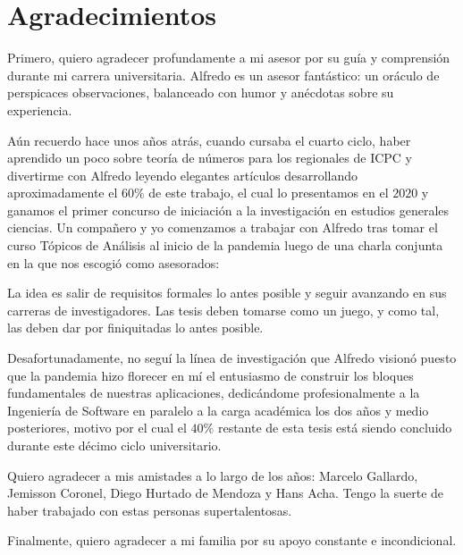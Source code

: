 \chapter*{Agradecimientos}
\thispagestyle{empty}

\vspace{-0.5cm}

Primero, quiero agradecer profundamente a mi asesor
por su guía y comprensión durante mi carrera universitaria.
Alfredo es un asesor fantástico:
un oráculo de perspicaces observaciones,
balanceado con humor
y anécdotas sobre su experiencia.

Aún recuerdo hace unos años atrás,
cuando cursaba el cuarto ciclo,
haber aprendido un poco sobre teoría de números
para los regionales de ICPC
y divertirme con Alfredo
leyendo elegantes artículos
desarrollando aproximadamente el \(60\%\) de este trabajo,
el cual lo presentamos en el \(2020\) y ganamos el
primer concurso de iniciación a la investigación en estudios generales ciencias.
Un compa\~nero y yo comenzamos a trabajar con Alfredo
tras tomar el curso Tópicos de Análisis al inicio de la pandemia
luego de una charla conjunta en la que nos escogió como asesorados:

\begin{displayquote}
La idea es salir de requisitos formales lo antes posible
y seguir avanzando en sus carreras de investigadores.
Las tesis deben tomarse como un juego,
y como tal,
las deben dar por finiquitadas lo antes posible.
\end{displayquote}

Desafortunadamente,
no seguí la línea de investigación
que Alfredo visionó
puesto que la pandemia
hizo florecer en mí
el entusiasmo de construir
los bloques fundamentales de nuestras aplicaciones,
dedicándome profesionalmente
a la Ingeniería de Software
en paralelo a la carga académica
los dos años y medio posteriores,
motivo por el cual el \(40\%\) restante de esta tesis
está siendo concluido durante este décimo ciclo universitario.

Quiero agradecer a mis amistades a lo largo de los años:
Marcelo Gallardo,
Jemisson Coronel,
Diego Hurtado de Mendoza
y
Hans Acha.
Tengo la suerte de haber trabajado con estas personas supertalentosas.

Finalmente, quiero agradecer a mi familia por su apoyo constante e incondicional.
